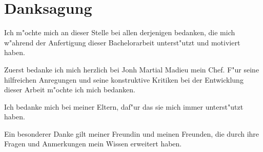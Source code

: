 \chapter{Danksagung}
Ich m"ochte mich an dieser Stelle bei allen derjenigen bedanken, die mich w"ahrend der Anfertigung dieser Bachelorarbeit unterst"utzt und motiviert haben. 

Zuerst bedanke ich mich herzlich bei Jonh Martial Madieu mein Chef. F"ur seine hilfreichen Anregungen und seine konstruktive Kritiken bei der Entwicklung dieser Arbeit m"ochte ich mich bedanken.

Ich bedanke mich bei meiner Eltern, daf"ur das sie mich immer unterst"utzt haben.

Ein besonderer Danke gilt meiner Freundin und meinen Freunden, die durch ihre Fragen und Anmerkungen mein Wissen erweitert haben.\\
\\[6ex]
 
%
%
